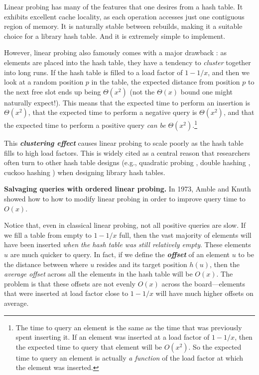 \documentclass[10pt]{article}
\theoremstyle{remark}
\theoremstyle{remark}
\newcommand{\defn}[1]{\textbf{\emph{#1}}}
\renewcommand{\paragraph}[1]{\vspace{.2 cm} \noindent \textbf{#1}}
\begin{document}
Linear probing has many of the features that one desires from a hash table. It exhibits excellent cache locality, as each operation accesses just one contiguous region of memory. It is naturally stable between rebuilds, making it a suitable choice for a library hash table. And it is extremely simple to implement.

However, linear probing also famously comes with a major drawback \cite{...}: as elements are placed into the hash table, they have a tendency to \emph{cluster} together into long runs. If the hash table is filled to a load factor of $1 - 1/x$, and then we look at a random position $p$ in the table, the expected distance from position $p$ to the next free slot ends up being $\Theta(x^2)$ (not the $\Theta(x)$ bound one might naturally expect!). This means that the expected time to perform an insertion is $\Theta(x^2)$, that the expected time to perform a negative query is $\Theta(x^2)$, and that the expected time to perform a positive query \emph{can be} $\Theta(x^2)$.\footnote{The time to query an element is the same as the time that was previously spent inserting it. If an element was inserted at a load factor of $1 - 1 /x$, then the expected time to query that element will be $O(x^2)$. So the expected time to query an element is actually \emph{a function} of the load factor at which the element was inserted.} 

This \defn{clustering effect} causes linear probing to scale poorly as the hash table fills to high load factors. This is widely cited as a central reason that researchers often turn to other hash table designs (e.g., quadratic probing \cite{...}, double hashing \cite{...}, cuckoo hashing \cite{...}) when designing library hash tables.

\paragraph{Salvaging queries with ordered linear probing.} In 1973, Amble and Knuth \cite{AmbleKn74} showed how to how to modify linear probing in order to improve query time to $O(x)$. 

Notice that, even in classical linear probing, not all positive queries are slow. If we fill a table from empty to $1 - 1/x$ full, then the vast majority of elements will have been inserted \emph{when the hash table was still relatively empty}. These elements $u$ are much quicker to query. In fact, if we define the \defn{offset} of an element $u$ to be the distance between where $u$ resides and its target position $h(u)$, then the \emph{average offset} across all the elements in the hash table will be $O(x)$. The problem is that these offsets are not evenly $O(x)$ across the board---elements that were inserted at load factor close to $1 - 1/x$ will have much higher offsets on average. 
\end{document}
